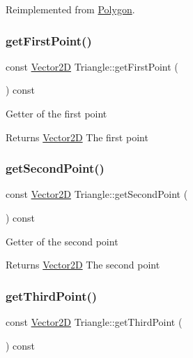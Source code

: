Reimplemented from \hyperlink{class_polygon_ae1ae9dd5e5613f119af3e31488427b01}{Polygon}.

\hypertarget{class_triangle_aa40afc17cb09bf78a863b2e93e5cff45}{}\label{class_triangle_aa40afc17cb09bf78a863b2e93e5cff45} 
\subsubsection{\texorpdfstring{get\+First\+Point()}{getFirstPoint()}}
{\footnotesize\ttfamily const \hyperlink{class_vector2_d}{Vector2D} Triangle\+::get\+First\+Point (\begin{DoxyParamCaption}{ }\end{DoxyParamCaption}) const}

Getter of the first point \begin{DoxyReturn}{Returns}
\hyperlink{class_vector2_d}{Vector2D} The first point 
\end{DoxyReturn}
\hypertarget{class_triangle_aa92252309b0e6d9ce26a1c9679b7cf19}{}\label{class_triangle_aa92252309b0e6d9ce26a1c9679b7cf19} 
\subsubsection{\texorpdfstring{get\+Second\+Point()}{getSecondPoint()}}
{\footnotesize\ttfamily const \hyperlink{class_vector2_d}{Vector2D} Triangle\+::get\+Second\+Point (\begin{DoxyParamCaption}{ }\end{DoxyParamCaption}) const}

Getter of the second point \begin{DoxyReturn}{Returns}
\hyperlink{class_vector2_d}{Vector2D} The second point 
\end{DoxyReturn}
\hypertarget{class_triangle_aa44238e4272fe5a2b9e83974f58f95c6}{}\label{class_triangle_aa44238e4272fe5a2b9e83974f58f95c6} 
\subsubsection{\texorpdfstring{get\+Third\+Point()}{getThirdPoint()}}
{\footnotesize\ttfamily const \hyperlink{class_vector2_d}{Vector2D} Triangle\+::get\+Third\+Point (\begin{DoxyParamCaption}{ }\end{DoxyParamCaption}) const}

